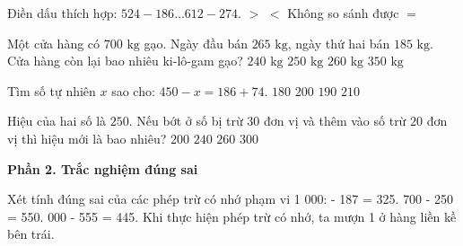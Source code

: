 \begin{ex} %
Điền dấu thích hợp: $524 - 186 \dots 612 - 274$.
\choice
{$>$}
{$<$}
{Không so sánh được}
{\True $=$}
\end{ex}

\begin{ex} %
Một cửa hàng có $700\text{ kg}$ gạo. Ngày đầu bán $265\text{ kg}$, ngày thứ hai bán $185\text{ kg}$. Cửa hàng còn lại bao nhiêu ki-lô-gam gạo?
\choice
{$240\text{ kg}$}
{\True $250\text{ kg}$}
{$260\text{ kg}$}
{$350\text{ kg}$}
\end{ex}

\begin{ex} %
Tìm số tự nhiên $x$ sao cho: $450 - x = 186 + 74$.
\choice
{$180$}
{$200$}
{\True $190$}
{$210$}
\end{ex}

\begin{ex} %
Hiệu của hai số là $250$. Nếu bớt ở số bị trừ $30$ đơn vị và thêm vào số trừ $20$ đơn vị thì hiệu mới là bao nhiêu?
\choice
{\True $200$}
{$240$}
{$260$}
{$300$}
\end{ex}

\textbf{Phần 2. Trắc nghiệm đúng sai}

\begin{ex} %
Xét tính đúng sai của các phép trừ có nhớ phạm vi 1 000:
\choiceTF
{ - 187 = 325.}
{700 - 250 = 550.}
{ 000 - 555 = 445.}
{\True Khi thực hiện phép trừ có nhớ, ta mượn 1 ở hàng liền kề bên trái.}
\end{ex}

